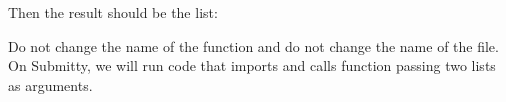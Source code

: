 \documentclass[letterpaper,10pt,english]{sphinxmanual}
\begin{document}
\begin{enumerate}
Then the result  should be the list:

\begin{sphinxVerbatim}[commandchars=\\\{\}]
\PYG{p}{[}                \PYG{p}{]}
\end{sphinxVerbatim}

Do not change the name of the function and do not change the name
of the file. On Submitty, we will run code that imports
 and calls function  passing two lists as
arguments.

\end{enumerate}



\renewcommand{\indexname}{Index}
\printindex
\end{document}
